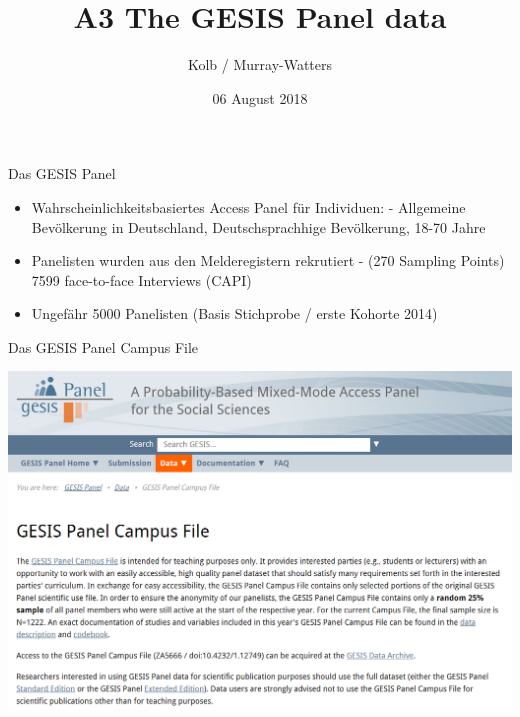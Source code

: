 \documentclass[ignorenonframetext,]{beamer}
\title{A3 The GESIS Panel data}
\author{Kolb / Murray-Watters}
\date{06 August 2018}
\providecommand{\tightlist}{%
  \setlength{\itemsep}{0pt}\setlength{\parskip}{0pt}}
\begin{document}
\frame{\titlepage}

\begin{frame}{Das GESIS Panel}

\begin{itemize}
\tightlist
\item
  Wahrscheinlichkeitsbasiertes Access Panel für Individuen: - Allgemeine
  Bevölkerung in Deutschland, Deutschsprachhige Bevölkerung, 18-70 Jahre
\item
  Panelisten wurden aus den Melderegistern rekrutiert - (270 Sampling
  Points) 7599 face-to-face Interviews (CAPI)
\item
  Ungefähr 5000 Panelisten (Basis Stichprobe / erste Kohorte 2014)
\end{itemize}

\end{frame}

\begin{frame}{Das GESIS Panel Campus File}

\includegraphics{figure/gpdata.PNG}

\end{frame}
\end{document}

